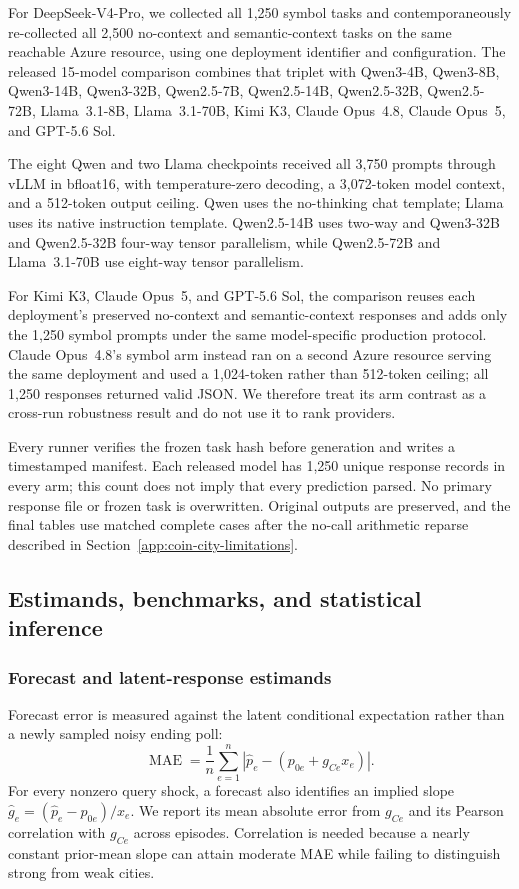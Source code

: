 For DeepSeek-V4-Pro, we collected all 1,250 symbol tasks and contemporaneously
re-collected all 2,500 no-context and semantic-context tasks on the same reachable
Azure resource, using one deployment identifier and configuration. The released
15-model comparison combines that triplet with Qwen3-4B, Qwen3-8B,
Qwen3-14B, Qwen3-32B, Qwen2.5-7B, Qwen2.5-14B, Qwen2.5-32B, Qwen2.5-72B,
Llama~3.1-8B, Llama~3.1-70B, Kimi K3, Claude Opus~4.8, Claude Opus~5, and
GPT-5.6 Sol.

The eight Qwen and two Llama checkpoints received all 3,750 prompts through vLLM
in bfloat16, with temperature-zero decoding, a 3,072-token model context, and a
512-token output ceiling. Qwen uses the no-thinking chat template; Llama uses its
native instruction template. Qwen2.5-14B uses two-way and Qwen3-32B and
Qwen2.5-32B four-way tensor parallelism, while Qwen2.5-72B and Llama~3.1-70B use
eight-way tensor parallelism.

For Kimi K3, Claude Opus~5, and GPT-5.6 Sol, the comparison reuses each
deployment's preserved no-context and semantic-context responses and adds only
the 1,250 symbol prompts under the same model-specific production protocol.
Claude Opus~4.8's symbol arm instead ran on a second Azure resource serving the
same deployment and used a 1,024-token rather than 512-token ceiling; all 1,250
responses returned valid JSON. We therefore treat its arm contrast as a
cross-run robustness result and do not use it to rank providers.

Every runner verifies the frozen task hash before generation and writes a
timestamped manifest. Each released model has 1,250 unique response records in
every arm; this count does not imply that every prediction parsed. No primary
response file or frozen task is overwritten. Original outputs are preserved, and
the final tables use matched complete cases after the no-call arithmetic reparse
described in Section~\ref{app:coin-city-limitations}.

\subsection{Estimands, benchmarks, and statistical inference}
\label{app:coin-city-analysis}

\subsubsection{Forecast and latent-response estimands}
Forecast error is measured against the latent conditional expectation rather than
a newly sampled noisy ending poll:
\[
  \operatorname{MAE}
  =\frac{1}{n}\sum_{e=1}^{n}
    \left|\widehat p_e-(p_{0e}+g_{Ce}x_e)\right|.
\]
For every nonzero query shock, a forecast also identifies an implied slope
\(\widehat g_e=(\widehat p_e-p_{0e})/x_e\). We report its mean absolute error from
\(g_{Ce}\) and its Pearson correlation with \(g_{Ce}\) across episodes.
Correlation is needed because a nearly constant prior-mean slope can attain
moderate MAE while failing to distinguish strong from weak cities.

